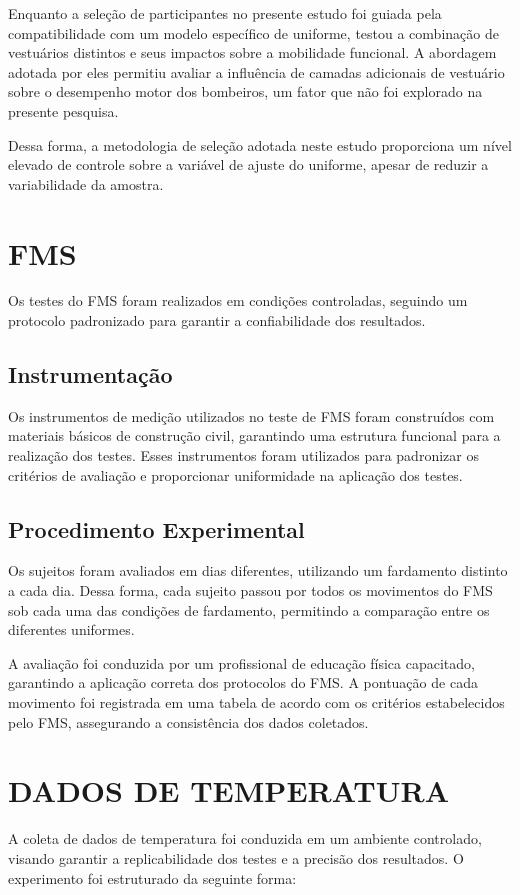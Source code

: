 \tab Enquanto a seleção de participantes no presente estudo foi guiada pela compatibilidade com um modelo específico de uniforme, \textcite{orr2019impact} testou a combinação de vestuários distintos e seus impactos sobre a mobilidade funcional. A abordagem adotada por eles permitiu avaliar a influência de camadas adicionais de vestuário sobre o desempenho motor dos bombeiros, um fator que não foi explorado na presente pesquisa.

Dessa forma, a metodologia de seleção adotada neste estudo proporciona um nível elevado de controle sobre a variável de ajuste do uniforme, apesar de reduzir a variabilidade da amostra.


\section{FMS}

Os testes do \acrlong{FMS} foram realizados em condições controladas, seguindo um protocolo padronizado para garantir a confiabilidade dos resultados. 

\subsection{Instrumentação}
Os instrumentos de medição utilizados no teste de \acrshort{FMS} foram construídos com materiais básicos de construção civil, garantindo uma estrutura funcional para a realização dos testes. Esses instrumentos foram utilizados para padronizar os critérios de avaliação e proporcionar uniformidade na aplicação dos testes.

\subsection{Procedimento Experimental}
Os sujeitos foram avaliados em dias diferentes, utilizando um fardamento distinto a cada dia. Dessa forma, cada sujeito passou por todos os movimentos do \acrshort{FMS} sob cada uma das condições de fardamento, permitindo a comparação entre os diferentes uniformes.

A avaliação foi conduzida por um profissional de educação física capacitado, garantindo a aplicação correta dos protocolos do \acrshort{FMS}. A pontuação de cada movimento foi registrada em uma tabela de acordo com os critérios estabelecidos pelo \acrshort{FMS}, assegurando a consistência dos dados coletados.

\section{DADOS DE TEMPERATURA}
A coleta de dados de temperatura foi conduzida em um ambiente controlado, visando garantir a replicabilidade dos testes e a precisão dos resultados. O experimento foi estruturado da seguinte forma:
